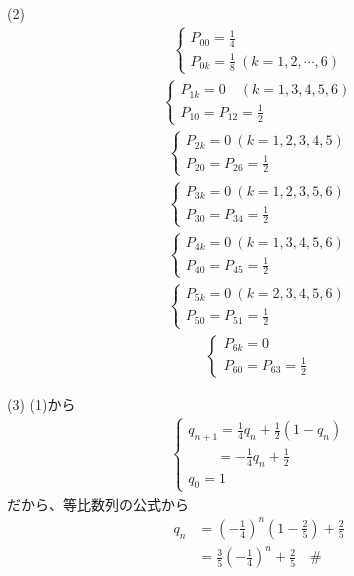 \documentclass[../main.tex]{subfiles}
\begin{document}
(2)
\begin{align*}
  \begin{cases}
    P_{00} = \frac{1}{4} \\
    P_{0k} = \frac{1}{8} \ (k=1,2,\cdots,6)
  \end{cases}
\end{align*}
\begin{align*}
  \begin{cases}
    P_{1k} = 0 \quad (k=1,3,4,5,6) \\
    P_{10} = P_{12} = \frac{1}{2}
  \end{cases}
\end{align*}
\begin{align*}
  \begin{cases}
    P_{2k} = 0 \ (k=1,2,3,4,5) \\
    P_{20} = P_{26} = \frac{1}{2}
  \end{cases}
\end{align*}
\begin{align*}
  \begin{cases}
    P_{3k} = 0 \ (k=1,2,3,5,6) \\
    P_{30} = P_{34} = \frac{1}{2}
  \end{cases}
\end{align*}
\begin{align*}
  \begin{cases}
    P_{4k} = 0 \ (k=1,3,4,5,6) \\
    P_{40} = P_{45} = \frac{1}{2}
  \end{cases}
\end{align*}
\begin{align*}
  \begin{cases}
    P_{5k} = 0 \ (k=2,3,4,5,6) \\
    P_{50} = P_{51} = \frac{1}{2}
  \end{cases}
\end{align*}
\begin{align*}
  \begin{cases}
    P_{6k} = 0 \\
    P_{60} = P_{63} = \frac{1}{2}
  \end{cases}
\end{align*}

(3) (1)から
\begin{align*}
  \begin{cases}
    q_{n+1} = \frac{1}{4}q_n + \frac{1}{2}(1-q_n) \\
    \qquad = -\frac{1}{4}q_n + \frac{1}{2} \\
    q_0 = 1
  \end{cases}
\end{align*}
だから、等比数列の公式から
\begin{align*}
  q_n &= \left(-\frac{1}{4}\right)^n \left(1 - \frac{2}{5}\right) + \frac{2}{5} \\
  &= \frac{3}{5}\left(-\frac{1}{4}\right)^n + \frac{2}{5} \quad \text{\#\ \ }
\end{align*}
\end{document}
